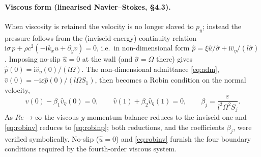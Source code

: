 \documentclass[11pt]{article}
\begin{document}
\paragraph{Viscous form (linearised Navier--Stokes, \S4.3).} When viscosity is retained the velocity
is no longer slaved to $p_y$; instead the pressure follows from the (inviscid-energy) continuity
relation $\mathrm{i}\sigma\,p+\rho c^2(-\mathrm{i}k_xu+\partial_yv)=0$, i.e.\ in non-dimensional form
$\hat p=\xi\hat u/\hat\sigma+\mathrm{i}\hat v_\eta/(l\hat\sigma)$. Imposing no-slip $\hat u=0$ at the
wall (and $\hat\sigma=\Omega$ there) gives $\hat p(0)=\mathrm{i}\hat v_\eta(0)/(l\Omega)$. The
non-dimensional admittance \eqref{eq:adm}, $\hat v(0)=-\mathrm{i}\varepsilon\hat p(0)/(l\Omega S_1)$,
then becomes a Robin condition on the normal velocity,
\begin{equation}
\hat v(0)-\beta_1\hat v_\eta(0)=0,\qquad \hat v(1)+\beta_2\hat v_\eta(1)=0,\qquad
\beta_j=\frac{\varepsilon}{l^2\Omega^2S_j}.
\label{eq:robinv}
\end{equation}
As $Re\to\infty$ the viscous $y$-momentum balance reduces to the inviscid one and \eqref{eq:robinv}
reduces to \eqref{eq:robinp}; both reductions, and the coefficients $\beta_j$, were verified
symbolically. No-slip ($\hat u=0$) and \eqref{eq:robinv} furnish the four boundary conditions required
by the fourth-order viscous system.
\end{document}
